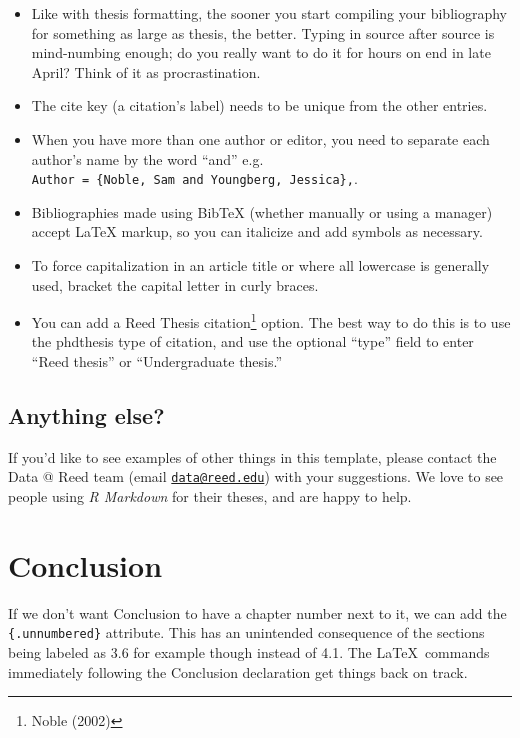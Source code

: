 \documentclass[12pt,twoside]{reedthesis}
\providecommand{\tightlist}{%
  \setlength{\itemsep}{0pt}\setlength{\parskip}{0pt}}
\begin{document}
  \begin{itemize}
  \tightlist
  \item
    Like with thesis formatting, the sooner you start compiling your
    bibliography for something as large as thesis, the better. Typing in
    source after source is mind-numbing enough; do you really want to do
    it for hours on end in late April? Think of it as procrastination.
  \item
    The cite key (a citation's label) needs to be unique from the other
    entries.
  \item
    When you have more than one author or editor, you need to separate
    each author's name by the word ``and'' e.g.
    \texttt{Author\ =\ \{Noble,\ Sam\ and\ Youngberg,\ Jessica\},}.
  \item
    Bibliographies made using BibTeX (whether manually or using a manager)
    accept LaTeX markup, so you can italicize and add symbols as
    necessary.
  \item
    To force capitalization in an article title or where all lowercase is
    generally used, bracket the capital letter in curly braces.
  \item
    You can add a Reed Thesis citation\footnote{Noble (2002)} option. The
    best way to do this is to use the phdthesis type of citation, and use
    the optional ``type'' field to enter ``Reed thesis'' or
    ``Undergraduate thesis.''
  \end{itemize}
  
  \section{Anything else?}\label{anything-else}
  
  If you'd like to see examples of other things in this template, please
  contact the Data @ Reed team (email
  \href{mailto:data@reed.edu}{\nolinkurl{data@reed.edu}}) with your
  suggestions. We love to see people using \emph{R Markdown} for their
  theses, and are happy to help.
  
  \chapter*{Conclusion}\label{conclusion}
  
  \setcounter{chapter}{4} \setcounter{section}{0}
  
  If we don't want Conclusion to have a chapter number next to it, we can
  add the \texttt{\{.unnumbered\}} attribute. This has an unintended
  consequence of the sections being labeled as 3.6 for example though
  instead of 4.1. The \LaTeX~commands immediately following the Conclusion
  declaration get things back on track.
  
\end{document}
